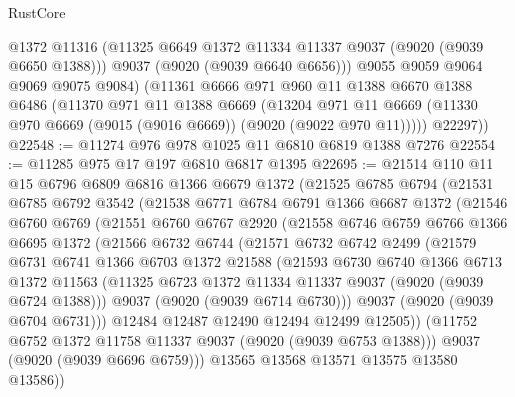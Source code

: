 \begin{lexlean}{RustCore}
\begin{coremodule}
          @1372
          @11316
          (@11325 @6649 @1372 @11334 @11337 @9037 (@9020 (@9039 @6650 @1388)))
          @9037
          (@9020 (@9039 @6640 @6656)))
        @9055
        @9059
        @9064
        @9069
        @9075
        @9084)
      (@11361
        @6666
        @971
        @960
        @11
        @1388
        @6670
        @1388
        @6486
        (@11370
          @971
          @11
          @1388
          @6669
          (@13204
            @971
            @11
            @6669
            (@11330 @970 @6669 (@9015 (@9016 @6669)) (@9020 (@9022 @970 @11)))))
        @22297))
@22548 := @11274 @976 @978 @1025 @11 @6810 @6819 @1388 @7276
@22554 := @11285 @975 @17 @197 @6810 @6817 @1395
@22695 := @21514
    @110
    @11
    @15
    @6796
    @6809
    @6816
    @1366
    @6679
    @1372
    (@21525
      @6785
      @6794
      (@21531
        @6785
        @6792
        @3542
        (@21538
          @6771
          @6784
          @6791
          @1366
          @6687
          @1372
          (@21546
            @6760
            @6769
            (@21551
              @6760
              @6767
              @2920
              (@21558
                @6746
                @6759
                @6766
                @1366
                @6695
                @1372
                (@21566
                  @6732
                  @6744
                  (@21571
                    @6732
                    @6742
                    @2499
                    (@21579
                      @6731
                      @6741
                      @1366
                      @6703
                      @1372
                      @21588
                      (@21593
                        @6730
                        @6740
                        @1366
                        @6713
                        @1372
                        @11563
                        (@11325 @6723 @1372 @11334 @11337 @9037 (@9020 (@9039 @6724 @1388)))
                        @9037
                        (@9020 (@9039 @6714 @6730)))
                      @9037
                      (@9020 (@9039 @6704 @6731)))
                    @12484
                    @12487
                    @12490
                    @12494
                    @12499
                    @12505))
                (@11752 @6752 @1372 @11758 @11337 @9037 (@9020 (@9039 @6753 @1388)))
                @9037
                (@9020 (@9039 @6696 @6759)))
              @13565
              @13568
              @13571
              @13575
              @13580
              @13586))

\end{coremodule}
\end{lexlean}
